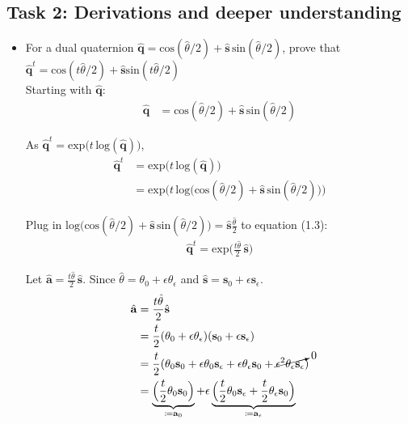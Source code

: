 \documentclass[paper=a4, fontsize=11pt]{scrartcl} %
\numberwithin{equation}{section} %
\numberwithin{figure}{section} %
\numberwithin{table}{section} %
\renewcommand{\vec}[1]{\mathbf{#1}}
\begin{document}
\subsection{Task 2: Derivations and deeper understanding}

\begin{itemize}
	\item For a dual quaternion $\hat{\vec{q}} = \text{cos} (\hat{\theta} /2) + \hat{\vec{s}} \, \text{sin} (\hat{\theta} /2)$, prove that $\hat{\vec{q}}^t = \text{cos} (t\hat{\theta} /2) + \hat{\vec{s}} \text{sin} (t\hat{\theta} /2)$ \\
	
	Starting with $\hat{\vec{q}}$:
	\begin{align}
		\hat{\vec{q}} &= \text{cos} (\hat{\theta} /2) + \hat{\vec{s}} \,\text{sin} (\hat{\theta} /2)
	\end{align}

	As $\hat{\vec{q}}^t	= \text{exp} \big(t \, \text{log}(\hat{\vec{q}}) \big)$, 
	\begin{align}
		\hat{\vec{q}}^t	&= \text{exp} \big( t \, \text{log}(\hat{\vec{q}}) \big) \\
						&= \text{exp}\Big(t \, \text{log} \big(\text{cos} (\hat{\theta} /2) + \hat{\vec{s}} \,\text{sin} (\hat{\theta} /2) \big) \Big)
	\end{align}

	Plug in $\text{log} \big(\text{cos} (\hat{\theta} /2) + \hat{\vec{s}} \,\text{sin} (\hat{\theta} /2) \big) = \hat{\vec{s}} \frac{\hat{\theta}}{2}$ to equation (1.3):
	\begin{align}
		\hat{\vec{q}}^t = \text{exp}\Big( \frac{t\hat{\theta}}{2} \,\hat{\vec{s}} \Big)
	\end{align}
	
	Let $\hat{\vec{a}} = \frac{t\hat{\theta}}{2} \,\hat{\vec{s}}$. Since $\hat{\theta} = \theta_0 + \epsilon \theta_\epsilon$ and $\hat{\vec{s}} = \vec{s}_0 + \epsilon\vec{s}_\epsilon$.
	\begin{align}
		\hat{\vec{a}} &= \frac{t\hat{\theta}}{2} \hat{\vec{s}} \\
		&= \frac{t}{2}(\theta_0 + \epsilon \theta_\epsilon)(\vec{s}_0 + \epsilon\vec{s}_\epsilon) \\
		&= \frac{t}{2} (\theta_0\vec{s}_0 + \epsilon \theta_0 \vec{s}_\epsilon + \epsilon \theta_\epsilon \vec{s}_0 + \cancelto{0}{\epsilon^2 \theta_\epsilon \vec{s}_\epsilon}) \\
		&= \underbrace{ \Big( \frac{t}{2} \theta_0\vec{s}_0 \Big) }_{\coloneqq \vec{a}_0} 
			+ \epsilon \underbrace{ \Big( \frac{t}{2} \theta_0 \vec{s}_\epsilon + \frac{t}{2} \theta_\epsilon \vec{s}_0 \Big) }_{\coloneqq \vec{a}_\epsilon }
	\end{align}
	

\end{itemize}
\end{document}

